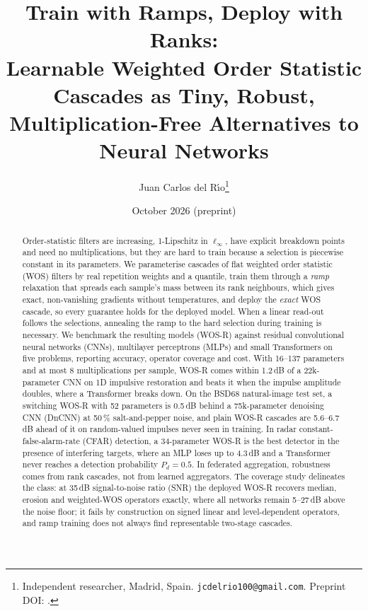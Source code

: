 \documentclass[11pt,a4paper]{article}
\title{Train with Ramps, Deploy with Ranks:\\
Learnable Weighted Order Statistic Cascades as Tiny, Robust,\\ Multiplication-Free Alternatives to Neural Networks}
\author{Juan Carlos del R{\'\i}o\thanks{Independent researcher, Madrid, Spain. \texttt{jcdelrio100@gmail.com}. Preprint DOI: \href{https://doi.org/\ppdoi}{\ppdoi}.}}
\date{October 2026 \quad (preprint)}
\theoremstyle{definition}
\theoremstyle{remark}
\begin{document}
\maketitle

\begin{abstract}
Order-statistic filters are increasing, 1-Lipschitz in $\ell_\infty$, have explicit breakdown points and need no
multiplications, but they are hard to train because a selection is piecewise constant in its parameters. We parameterise
cascades of flat weighted order statistic (WOS) filters by real repetition weights and a quantile, train them through a
\emph{ramp} relaxation that spreads each sample's mass between its rank neighbours, which gives exact, non-vanishing
gradients without temperatures, and deploy the \emph{exact} WOS cascade, so every guarantee holds for the deployed model.
When a linear read-out follows the selections, annealing the ramp to the hard selection during training is necessary.
We benchmark the resulting models (WOS-R) against residual convolutional neural networks (CNNs), multilayer perceptrons (MLPs) and small Transformers on five
problems, reporting
accuracy, operator coverage and cost. With 16--137 parameters and at most 8 multiplications per sample, WOS-R comes
within 1.2\,dB of a 22k-parameter CNN on 1D impulsive restoration and beats it when the impulse amplitude doubles, where
a Transformer breaks down. On the BSD68 natural-image test set, a switching WOS-R with 52 parameters is 0.5\,dB behind a 75k-parameter denoising CNN
(DnCNN) at
50\,\% salt-and-pepper noise, and plain WOS-R cascades are 5.6--6.7\,dB ahead of it on random-valued impulses never seen in
training. In radar constant-false-alarm-rate (CFAR) detection, a 34-parameter WOS-R is the best detector in the presence of interfering targets, where an
MLP loses up to 4.3\,dB and a Transformer never reaches a detection probability $P_d=0.5$. In federated aggregation, robustness comes from rank
cascades, not from learned aggregators. The coverage study delineates the class: at 35\,dB signal-to-noise ratio (SNR) the deployed WOS-R recovers median, erosion and
weighted-WOS operators exactly, where all networks remain 5--27\,dB above the noise floor; it fails by construction on
signed linear and level-dependent operators, and ramp training does not always find representable two-stage cascades.
\end{abstract}

\end{document}
